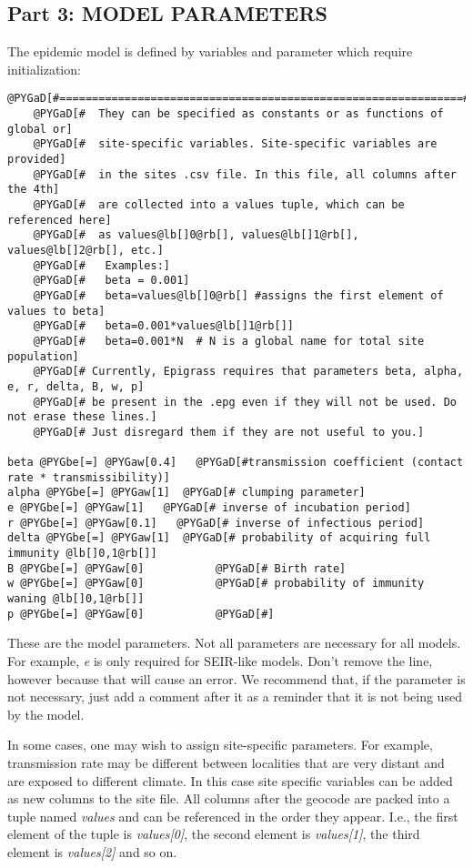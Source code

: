 \documentclass[a4paper,10pt]{manual}
\begin{document}
\subsection{Part 3: MODEL PARAMETERS}

The epidemic model is defined by variables and parameter which require initialization:

\begin{Verbatim}[commandchars=@\[\]]
@PYGaD[#==============================================================#]
    @PYGaD[#  They can be specified as constants or as functions of global or]
    @PYGaD[#  site-specific variables. Site-specific variables are provided]
    @PYGaD[#  in the sites .csv file. In this file, all columns after the 4th]
    @PYGaD[#  are collected into a values tuple, which can be referenced here]
    @PYGaD[#  as values@lb[]0@rb[], values@lb[]1@rb[], values@lb[]2@rb[], etc.]
    @PYGaD[#   Examples:]
    @PYGaD[#   beta = 0.001]
    @PYGaD[#   beta=values@lb[]0@rb[] #assigns the first element of values to beta]
    @PYGaD[#   beta=0.001*values@lb[]1@rb[]]
    @PYGaD[#   beta=0.001*N  # N is a global name for total site population]
    @PYGaD[# Currently, Epigrass requires that parameters beta, alpha, e, r, delta, B, w, p]
    @PYGaD[# be present in the .epg even if they will not be used. Do not erase these lines.]
    @PYGaD[# Just disregard them if they are not useful to you.]

beta @PYGbe[=] @PYGaw[0.4]   @PYGaD[#transmission coefficient (contact rate * transmissibility)]
alpha @PYGbe[=] @PYGaw[1]  @PYGaD[# clumping parameter]
e @PYGbe[=] @PYGaw[1]   @PYGaD[# inverse of incubation period]
r @PYGbe[=] @PYGaw[0.1]   @PYGaD[# inverse of infectious period]
delta @PYGbe[=] @PYGaw[1]  @PYGaD[# probability of acquiring full immunity @lb[]0,1@rb[]]
B @PYGbe[=] @PYGaw[0]           @PYGaD[# Birth rate]
w @PYGbe[=] @PYGaw[0]           @PYGaD[# probability of immunity waning @lb[]0,1@rb[]]
p @PYGbe[=] @PYGaw[0]           @PYGaD[#]
\end{Verbatim}

These are the model parameters. Not all parameters are necessary for all models. For example, \emph{e} is only required for SEIR-like models. Don't
remove the line, however because that will cause an error. We recommend that, if the parameter is not necessary, just add a comment after it as a reminder that it is not being used by the model.

In some cases, one may wish to assign site-specific parameters. For example, transmission rate may be different between localities that are very distant and are exposed to different climate. In this case site specific variables can be added as new columns to the site file. All columns after the geocode are packed into a tuple named \emph{values} and can be referenced in the order they appear. I.e., the first element of the tuple is \emph{values{[}0{]}}, the second element is \emph{values{[}1{]}}, the third element is \emph{values{[}2{]}} and so on.
\end{document}
